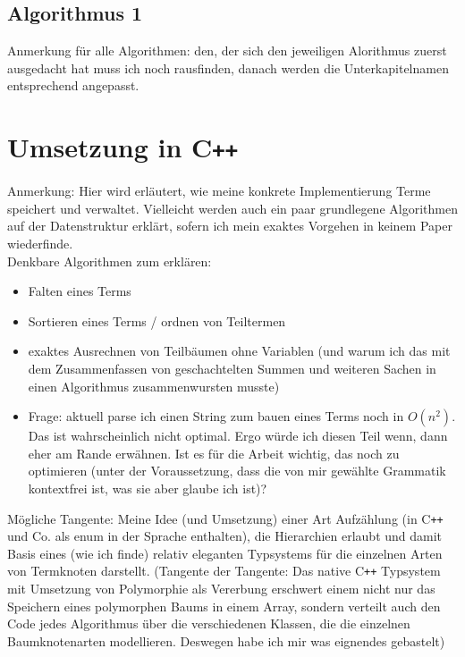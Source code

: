 \documentclass{article}
\begin{document}
\subsection{Algorithmus 1}
\begin{itshape}
Anmerkung für alle Algorithmen: den, der sich den jeweiligen Alorithmus zuerst ausgedacht hat muss ich noch rausfinden, danach werden die  Unterkapitelnamen entsprechend angepasst.
\end{itshape}



\section{Umsetzung in C\texttt{++}}
\begin{itshape}
Anmerkung: Hier wird erläutert, wie meine konkrete Implementierung Terme speichert und verwaltet. Vielleicht werden auch ein paar grundlegene Algorithmen auf der Datenstruktur erklärt, sofern ich mein exaktes Vorgehen in keinem Paper wiederfinde.\\
Denkbare Algorithmen zum erklären:
\begin{itemize}
    \item Falten eines Terms
    \item Sortieren eines Terms / ordnen von Teiltermen
    \item exaktes Ausrechnen von Teilbäumen ohne Variablen (und warum ich das mit dem Zusammenfassen von geschachtelten Summen und weiteren Sachen in einen Algorithmus zusammenwursten musste)
    \item Frage: aktuell parse ich einen String zum bauen eines Terms noch in $O(n^2)$. Das ist wahrscheinlich nicht optimal. Ergo würde ich diesen Teil wenn, dann eher am Rande erwähnen. Ist es für die Arbeit wichtig, das noch zu optimieren (unter der Voraussetzung, dass die von mir gewählte Grammatik kontextfrei ist, was sie aber glaube ich ist)?
\end{itemize}

Mögliche Tangente: Meine Idee (und Umsetzung) einer Art Aufzählung (in C\texttt{++} und Co. als enum in der Sprache enthalten), die Hierarchien erlaubt und damit Basis eines (wie ich finde) relativ eleganten Typsystems für die einzelnen Arten von Termknoten darstellt. (Tangente der Tangente: Das native C\texttt{++} Typsystem mit Umsetzung von Polymorphie als Vererbung erschwert einem nicht nur das Speichern eines polymorphen Baums in einem Array, sondern verteilt auch den Code jedes Algorithmus über die verschiedenen Klassen, die die einzelnen Baumknotenarten modellieren. Deswegen habe ich mir was eignendes gebastelt)
\end{itshape}
\end{document}
